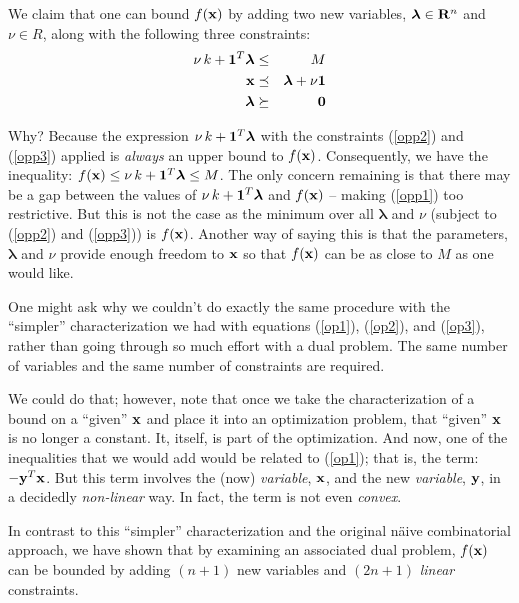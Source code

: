 \documentclass[12pt]{article}
\begin{document}
We claim that one can bound $f({\bf x})$ by adding two new variables,
${\boldsymbol \lambda} \in {\bf R}^n$ 
and $\nu \in R$, along with the following three constraints:
\begin{eqnarray}
	\nu \, k + {\bf 1}^T {\boldsymbol \lambda}  & \le & M \label{opp1} \\ 
	{\bf x} & \preceq & {\boldsymbol \lambda} + \nu {\bf 1} \label{opp2} \\
	{\boldsymbol \lambda} & \succeq & {\bf 0}  \label{opp3}
\end{eqnarray}

Why? Because the expression $\nu \, k + {\bf 1}^T {\boldsymbol \lambda}$ with
the constraints (\ref{opp2}) and (\ref{opp3}) applied is {\it always\/} 
an upper bound to $f({\bf x})$. 
Consequently, we have the inequality: 
$f({\bf x}) \le \nu \, k + {\bf 1}^T {\boldsymbol \lambda} \le M$.
The only concern remaining is that there may be a gap between the values of 
$\nu \, k + {\bf 1}^T {\boldsymbol \lambda}$ 
and $f({\bf x})$ -- making (\ref{opp1}) too restrictive. 
But this is not the case as the minimum over all ${\boldsymbol \lambda}$ 
and $\nu$ (subject to (\ref{opp2}) and (\ref{opp3})) is $f({\bf x})$.
Another way of saying this is that the parameters, ${\boldsymbol \lambda}$ 
and $\nu$ provide enough freedom to ${\bf x}$ so that $f({\bf x})$ can be 
as close to $M$ as one would like.


One might ask why we couldn't do exactly the same procedure with the ``simpler''
characterization we had with equations
(\ref{op1}), (\ref{op2}), and (\ref{op3}), rather than going through so much 
effort with a dual problem. The same number of variables and the same number 
of constraints are required.

We could do that; however, note that once we take the characterization of a 
bound on a ``given'' ${\bf x}$ and place it into an optimization problem, that 
``given'' ${\bf x}$ is no longer a constant. It, itself, is part of the 
optimization. And now, one of the inequalities that we would add
would be related to (\ref{op1}); that is, the term: $-{\bf y}^T {\bf x}$. But 
this term involves the (now) {\it variable\/}, ${\bf x}$, and the new 
{\it variable\/}, ${\bf y}$, in a decidedly {\it non-linear\/} way.
In fact, the term is not even {\it convex\/}.

In contrast to this ``simpler'' characterization and the original n{\"a}ive 
combinatorial approach, we have shown that 
by examining an associated dual problem, $f({\bf x})$ can be bounded by
adding $(n+1)$ new variables and $(2n + 1)$ {\it linear\/} constraints.
\end{document}
